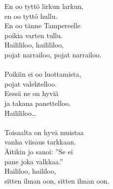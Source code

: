 
            En oo tyttö lirkun larkun, \\
            en oo tyttö hullu. \\
            En oo tänne Tampereelle \\
            poikia varten tullu. \\
            Hailililoo, hailililoo, \\
            pojat narrailoo, pojat narrailoo. \\
\hspace{10mm} \\
            Poikiin ei oo luottamista, \\
            pojat valehtelloo. \\
            Eessä ne on hyviä \\
            ja takana panettelloo. \\
            Hailililoo… \\
\hspace{10mm} \\
            Toisaalta on hyvä muistaa \\
            vanha viisaus tarkkaan. \\
            Äitikin jo sanoi: ”Se ei \\
            pane joka valkkaa.” \\
            Haililoo, haililoo, \\
            sitten ilman oon, sitten ilman oon. \\
